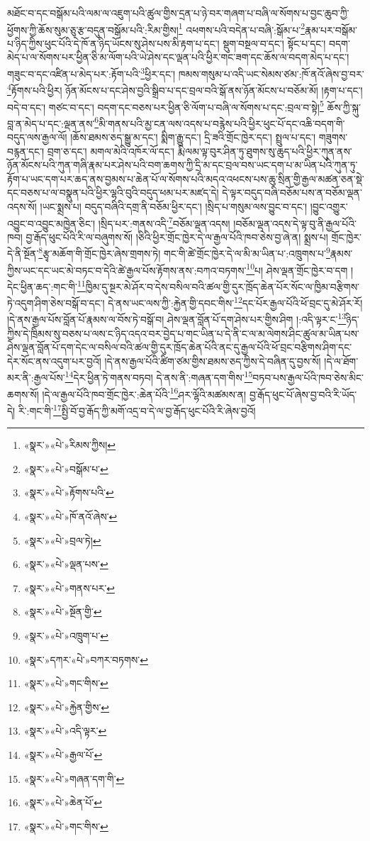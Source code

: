 མཐོང་བ་དང་བསྒོམ་པའི་ལམ་ལ་འཇུག་པའི་ཚུལ་གྱིས་དྲན་པ་ཉེ་བར་གཞག་པ་བཞི་ལ་སོགས་པ་བྱང་ཆུབ་ཀྱི་ཕྱོགས་ཀྱི་ཆོས་སུམ་ཅུ་རྩ་བདུན་བསྒོམ་པའི་:རིམ་གྱིས།\footnote{«སྣར་»«པེ་»རིམས་ཀྱིས།} འཕགས་པའི་བདེན་པ་བཞི་:སྒོམ་པ་\footnote{«སྣར་»«པེ་»བསྒོམ་པ་}རྣམ་པར་བསྒོམ་པ་ཉིད་ཀྱིས་ཕུང་པོའི་དེ་ཁོ་ན་ཉིད་ཡོངས་སུ་ཤེས་པས་མི་རྟག་པ་དང་། སྡུག་བསྔལ་བ་དང་། སྟོང་པ་དང་། བདག་མེད་པ་ལ་སོགས་པར་ཕྱིན་ཅི་མ་ལོག་པའི་ཡེ་ཤེས་དང་ལྡན་པའི་ཕྱིར་གང་ཟག་དང་ཆོས་ལ་བདག་མེད་པ་དང་། གཟུང་བ་དང་འཛིན་པ་མེད་པར་:རྟོག་པའི་\footnote{«སྣར་»«པེ་»རྟོགས་པའི་}ཕྱིར་དང་། ཁམས་གསུམ་པ་འདི་ཡང་སེམས་ཙམ་:ཁོ་ནའོ་ཞེས་བྱ་བར་\footnote{«སྣར་»«པེ་»ཁོ་ནའོ་ཞེས་}རྟོགས་པའི་ཕྱིར། ཉོན་མོངས་པ་དང་ཤེས་བྱའི་སྒྲིབ་པ་དང་བྲལ་བའི་སྒོ་ནས་ཉོན་མོངས་པ་བཅོམ་མོ། །རྟག་པ་དང་། བདེ་བ་དང་། གཙང་བ་དང་། བདག་དང་བཅས་པར་ཕྱིན་ཅི་ལོག་པ་བཞི་ལ་སོགས་པ་དང་:བྲལ་བ་སྟེ།\footnote{«སྣར་»«པེ་»བྲལ་ཏེ།} ཆོས་ཀྱི་སྐུ་བླ་ན་མེད་པ་དང་:ལྡན་ནས་\footnote{«སྣར་»«པེ་»ལྡན་པས་}མི་གནས་པའི་མྱ་ངན་ལས་འདས་པ་བརྙེས་པའི་ཕྱིར་ཕུང་པོ་དང་འཆི་བདག་གི་བདུད་ལས་རྒྱལ་ལོ། །ཆོས་ཐམས་ཅད་སྒྱུ་མ་དང་། སྨིག་རྒྱུ་དང་། དྲི་ཟའི་གྲོང་ཁྱེར་དང་། སྤྲུལ་པ་དང་། གཟུགས་བརྙན་དང་། བྲག་ཅ་དང་། མགལ་མེའི་འཁོར་ལོ་དང་། རྨི་ལམ་ལྟ་བུར་ཤིན་ཏུ་ཐུགས་སུ་ཆུད་པའི་ཕྱིར་ཀུན་ནས་ཉོན་མོངས་པའི་ཀུན་གཞི་རྣམ་པར་ཤེས་པའི་བག་ཆགས་ཀྱི་དྲི་མ་དང་བྲལ་བས་ཡང་དག་པ་མ་ཡིན་པའི་ཀུན་ཏུ་རྟོག་པ་ཡང་དག་པར་ཆད་ནས་བྱམས་པ་ཆེན་པོ་ལ་སོགས་པའི་མདའ་འཕངས་པས་ཆུ་སྲིན་གྱི་རྒྱལ་མཚན་ཅན་སྡེ་དང་བཅས་པ་ལ་བསྣུན་པའི་ཕྱིར་ལྷའི་བུའི་བདུད་ཕམ་པར་མཛད་དེ། དེ་ལྟར་བདུད་བཞི་བཅོམ་པས་ན་བཅོམ་ལྡན་འདས་སོ། །ཡང་སྨྲས་པ། བདུད་བཞིའི་དགྲ་ནི་བཅོམ་ཕྱིར་དང་། །སྲིད་པ་གསུམ་ལས་བྱུང་བ་དང་། །བྱུང་འགྱུར་འབྱུང་བ་འབྱུང་མཁྱེན་ཅིང་། །སྲིད་པར་:གནས་འདི་\footnote{«སྣར་»«པེ་»གནས་པར་}བཅོམ་ལྡན་འདས། །བཅོམ་ལྡན་འདས་དེ་ལྟ་བུ་ནི་རྒྱལ་པོའི་ཁབ། བྱ་རྒོད་ཕུང་པོའི་རི་ལ་བཞུགས་སོ། །ཅིའི་ཕྱིར་གྲོང་ཁྱེར་དེ་ལ་རྒྱལ་པོའི་ཁབ་ཅེས་བྱ་ཞེ་ན། སྨྲས་པ། གྲོང་ཁྱེར་དེ་ནི་སྔོན་\footnote{«སྣར་»«པེ་»སྔོན་གྱི་}རྩྭ་མཆོག་གི་གྲོང་ཁྱེར་ཞེས་གྲགས་ཏེ། གང་གི་ཚེ་གྲོང་ཁྱེར་དེ་ལ་མི་མ་ཡིན་པ་:འཁྲུགས་པ་\footnote{«སྣར་»«པེ་»འཁྲུག་པ་}རྣམས་ཀྱིས་ཡང་དང་ཡང་མེ་བཏང་བ་དེའི་ཚེ་རྒྱལ་པོས་རྟོགས་ནས་:བཀའ་བཏགས་\footnote{«སྣར་»དཀར་«པེ་»བཀར་བཏགས་}པ། ཤེས་ལྡན་གྲོང་ཁྱེར་བ་དག །དེང་ཕྱིན་ཆད་:གང་གི་\footnote{«སྣར་»«པེ་»གང་གིས་}ཁྱིམ་དུ་སྔར་མེ་ཤོར་བ་དེས་བསིལ་བའི་ཚལ་གྱི་དུར་ཁྲོད་ཆེན་པོར་སོང་ལ་ཁྱིམ་བརྩིགས་ཏེ་འདུག་ཤིག་ཅེས་བསྒོ་བ་དང་། དེ་ནས་ཡང་ལས་ཀྱི་:རྐྱེན་གྱི་དབང་གིས་\footnote{«སྣར་»«པེ་»རྐྱེན་གྱིས་}དང་པོར་རྒྱལ་པོའི་ཕོ་བྲང་དུ་མེ་ཤོར་རོ། །དེ་ནས་རྒྱལ་པོས་བློན་པོ་རྣམས་ལ་བོས་ཏེ་བསྒོ་བ། ཤེས་ལྡན་བློན་པོ་དག་ཤེས་པར་གྱིས་ཤིག །:འདི་ལྟར་ང་\footnote{«སྣར་»«པེ་»འདི་ལྟར་}ཉིད་ཀྱིས་དེ་ཁྲིམས་སུ་བཅས་པ་ལས་ང་ཉིད་འདའ་བར་བྱེད་པ་གང་ཡིན་པ་དེ་ནི་ང་ལ་མ་ལེགས་ཤིང་ཚུལ་མ་ཡིན་པས་ཤེས་ལྡན་བློན་པོ་དག་དེང་ལ་བསིལ་བའི་ཚལ་གྱི་དུར་ཁྲོད་ཆེན་པོའི་ནང་དུ་རྒྱལ་པོའི་ཕོ་བྲང་བརྩིགས་ཤིག་དང་དེར་སོང་ནས་འདུག་པར་བྱའོ། །དེ་ནས་རྒྱལ་པོའི་ཚིག་ཙམ་གྱིས་ཐམས་ཅད་ཀྱིས་དེ་བཞིན་དུ་བྱས་སོ། །དེ་ལ་ཐོག་མར་ནི་:རྒྱལ་པོས་\footnote{«སྣར་»«པེ་»རྒྱལ་པོ་}དེར་ཕྱིན་ཏེ་གནས་བཏབ། དེ་ནས་ནི་:གཞན་དག་གིས་\footnote{«སྣར་»«པེ་»གཞན་དག་གི་}བཏབ་པས་རྒྱལ་པོའི་ཁབ་ཅེས་མིང་ཆགས་སོ། །དེ་ལ་རྒྱལ་པོའི་ཁབ་གྲོང་ཁྱེར་:ཆེན་པོའི་\footnote{«སྣར་»«པེ་»ཆེན་པོ་}ཤར་ལྷོའི་མཚམས་ན། བྱ་རྒོད་ཕུང་པོ་ཞེས་བྱ་བའི་རི་ཡོད་དེ། རི་:གང་གི་\footnote{«སྣར་»«པེ་»གང་གིས་}སྤྱི་བོ་བྱ་རྒོད་ཀྱི་མགོ་འདྲ་བ་དེ་ལ་བྱ་རྒོད་ཕུང་པོའི་རི་ཞེས་བྱའོ། 